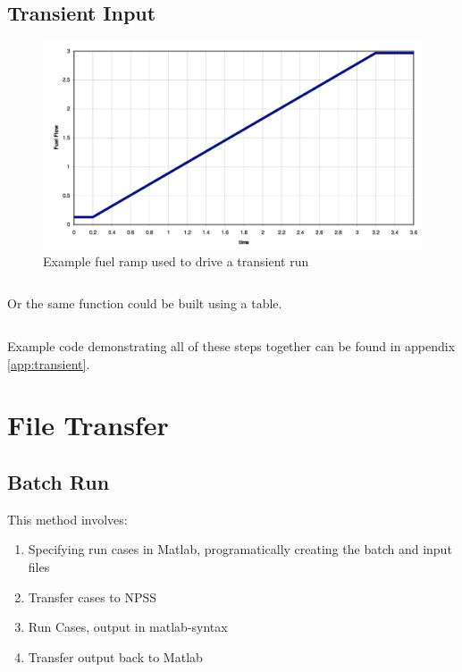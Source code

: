 \documentclass[heading.tex]{subfiles}
\begin{document}
\subsection{Transient Input}



\begin{figure}[H]
\centering
\includegraphics[width=1.0\textwidth]{images/fuelRamp}
\caption{Example fuel ramp used to drive a transient run}
\label{f:ramp}
\end{figure}

\begin{adjustwidth}{-1cm}{-1cm}
 \inputminted[]{c++}{code/rampFn}
 \end{adjustwidth} 
 
Or the same function could be built using a table. 
 
 \begin{adjustwidth}{-1cm}{-1cm}
 \inputminted[]{c++}{code/rampTb}
 \end{adjustwidth} 

Example code demonstrating all of these steps together can be found in appendix \cref{app:transient}.

\section{File Transfer}
\subsection{Batch Run}
This method involves:

\begin{enumerate}
  \item Specifying run cases in Matlab, programatically creating the batch and input files
  \item Transfer cases to NPSS
  \item Run Cases, output in matlab-syntax
  \item Transfer output back to Matlab
\end{enumerate}
\end{document}
